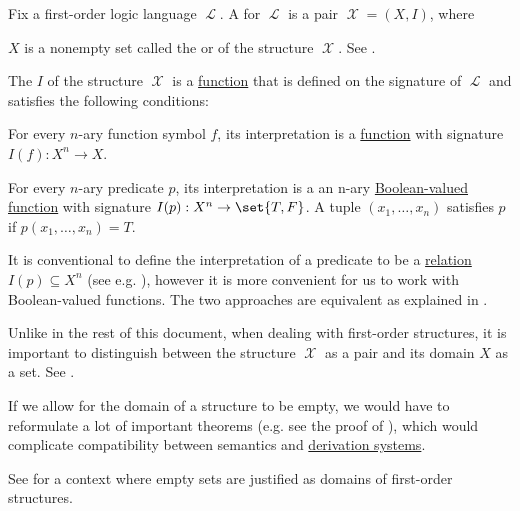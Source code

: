 \begin{definition}\label{def:first_order_structure}
  Fix a first-order logic language \( \mscrL \). A  for \( \mscrL \) is a pair \( \mscrX = (X, I) \), where
  \begin{thmenum}
     \( X \) is a nonempty set called the  or  of the structure \( \mscrX \). See .

     The  \( I \) of the structure \( \mscrX \) is a \hyperref[def:function]{function} that is defined on the signature of \( \mscrL \) and satisfies the following conditions:
    \begin{thmenum}
       For every \( n \)-ary function symbol \( f \), its interpretation is a \hyperref[def:function]{function} with signature \( I(f): X^n \to X \).

       For every \( n \)-ary predicate \( p \), its interpretation is a an n-ary \hyperref[def:boolean_function]{Boolean-valued function} with signature \( I(p): X^n \to \set{ T, F } \). A tuple \( (x_1, \ldots, x_n) \) satisfies \( p \) if \( p(x_1, \ldots, x_n) = T \).

      It is conventional to define the interpretation of a predicate to be a \hyperref[def:relation]{relation} \( I(p) \subseteq X^n \) (see e.g. ), however it is more convenient for us to work with Boolean-valued functions. The two approaches are equivalent as explained in .
    \end{thmenum}
  \end{thmenum}

  Unlike in the rest of this document, when dealing with first-order structures, it is important to distinguish between the structure \( \mscrX \) as a pair and its domain \( X \) as a set. See .
\end{definition}

\begin{remark}\label{rem:empty_models}
   If we allow for the domain of a structure to be empty, we would have to reformulate a lot of important theorems (e.g. see the proof of ), which would complicate compatibility between semantics and \hyperref[def:proof_derivation_system]{derivation systems}.

   See  for a context where empty sets are justified as domains of first-order structures.
\end{remark}

